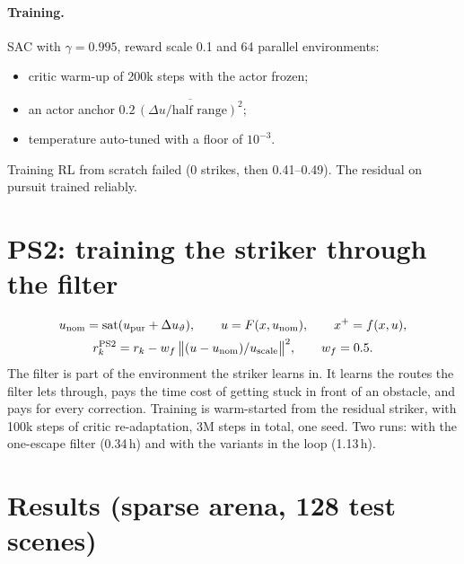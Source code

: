 \documentclass[11pt]{article}
\newcommand{\sat}{\operatorname{sat}}
\begin{document}
\paragraph{Training.} SAC with $\gamma=0.995$, reward scale 0.1 and 64 parallel environments:
\begin{itemize}
\item critic warm-up of 200k steps with the actor frozen;
\item an actor anchor $0.2\,\overline{(\Delta u/\text{half range})^2}$;
\item temperature auto-tuned with a floor of $10^{-3}$.
\end{itemize}
Training RL from scratch failed (0 strikes, then 0.41--0.49). The residual on pursuit trained reliably.

\section{PS2: training the striker through the filter}\label{sec:ps2}

\begin{gather}
u_{\rm nom}=\sat(u_{\rm pur}+\Delta u_\vartheta),\qquad u=F(x,u_{\rm nom}),\qquad x^+=f(x,u),\\
r^{\rm PS2}_k=r_k-w_f\,\big\|(u-u_{\rm nom})/u_{\rm scale}\big\|^2,\qquad w_f=0.5 .
\end{gather}
The filter is part of the environment the striker learns in. It learns the routes the filter lets through, pays the time cost of getting stuck in front of an obstacle, and pays for every correction.
Training is warm-started from the residual striker, with 100k steps of critic re-adaptation, 3M steps in total, one seed.
Two runs: with the one-escape filter (0.34\,h) and with the variants in the loop (1.13\,h).

\section{Results (sparse arena, 128 test scenes)}\label{sec:results}
\end{document}
